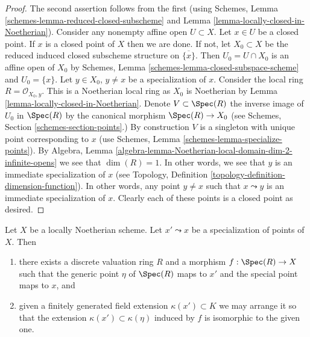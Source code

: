 \begin{proof}
The second assertion follows from the first (using
Schemes, Lemma \ref{schemes-lemma-reduced-closed-subscheme}
and Lemma \ref{lemma-locally-closed-in-Noetherian}).
Consider any nonempty affine open $U \subset X$.
Let $x \in U$ be a closed point. If $x$ is a closed point
of $X$ then we are done. If not, let $X_0 \subset X$ be the
reduced induced closed subscheme structure on $\overline{\{x\}}$.
Then $U_0 = U \cap X_0$ is an affine open of $X_0$ by
Schemes, Lemma \ref{schemes-lemma-closed-subspace-scheme} and
$U_0 = \{x\}$. Let $y \in X_0$, $y \not = x$ be a specialization of $x$.
Consider the local ring $R = \mathcal{O}_{X_0, y}$.
This is a Noetherian local ring as $X_0$ is Noetherian
by Lemma \ref{lemma-locally-closed-in-Noetherian}. Denote $V \subset \Spec(R)$
the inverse image of $U_0$ in $\Spec(R)$ by the canonical morphism
$\Spec(R) \to X_0$ (see Schemes, Section \ref{schemes-section-points}.)
By construction $V$ is a singleton with unique point corresponding to $x$ (use
Schemes, Lemma \ref{schemes-lemma-specialize-points}).
By
Algebra, Lemma \ref{algebra-lemma-Noetherian-local-domain-dim-2-infinite-opens}
we see that $\dim(R) = 1$.
In other words, we see that $y$ is an immediate specialization
of $x$ (see Topology, Definition \ref{topology-definition-dimension-function}).
In other words, any
point $y \not = x$ such that $x \leadsto y$ is an immediate
specialization of $x$. Clearly each of these points is a
closed point as desired.
\end{proof}

\begin{lemma}
\label{lemma-locally-Noetherian-specialization-dvr}
Let $X$ be a locally Noetherian scheme.
Let $x' \leadsto x$ be a specialization of points of $X$.
Then
\begin{enumerate}
\item there exists a discrete valuation ring $R$ and a morphism
$f : \Spec(R) \to X$ such that the generic point $\eta$ of
$\Spec(R)$ maps to $x'$ and the special point maps to $x$, and
\item given a finitely generated field extension $\kappa(x') \subset K$
we may arrange it so that the extension $\kappa(x') \subset \kappa(\eta)$
induced by $f$ is isomorphic to the given one.
\end{enumerate}
\end{lemma}

